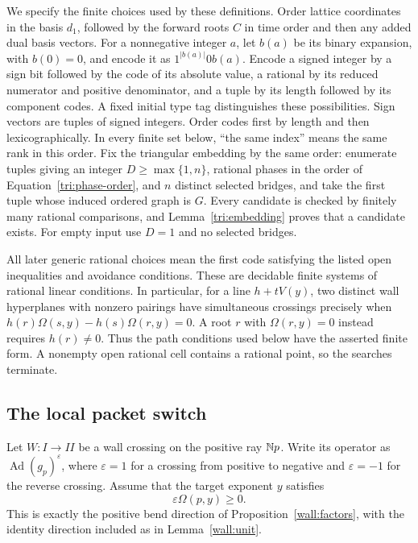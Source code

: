We specify the finite choices used by these definitions. Order lattice
coordinates in the basis $d_1$, followed by the forward roots $C$ in
time order and then any added dual basis vectors.
For a nonnegative integer $a$,
let $b(a)$ be its binary expansion, with $b(0)=0$, and encode it as
$1^{|b(a)|}0b(a)$.  Encode a signed integer by a sign bit followed by
the code of its absolute value, a rational by its reduced numerator
and positive denominator, and a tuple by its length followed by its
component codes.  A fixed initial type tag distinguishes these
possibilities.  Sign vectors are tuples of signed integers.  Order
codes first by length and then lexicographically.  In every finite
set below, ``the same index'' means the same rank in this order.
Fix the triangular embedding by the same order: enumerate tuples giving
an integer $D\geq\max\{1,n\}$, rational phases in the order of
Equation~\eqref{tri:phase-order}, and $n$ distinct selected bridges,
and take the first tuple whose induced ordered graph is $G$.
Every candidate is checked by finitely many rational comparisons, and
Lemma~\ref{tri:embedding} proves that a candidate exists.  For empty
input use $D=1$ and no selected bridges.

All later generic rational choices mean the first code satisfying the
listed open inequalities and avoidance conditions.  These are decidable
finite systems of rational linear conditions.  In particular, for a
line $h+tV(y)$, two distinct wall hyperplanes with nonzero pairings
have simultaneous crossings precisely when
$h(r)\Omega(s,y)-h(s)\Omega(r,y)=0$.  A root $r$ with
$\Omega(r,y)=0$ instead requires $h(r)\ne0$.  Thus the path conditions
used below have the asserted finite form.  A nonempty open rational cell contains a rational
point, so the searches terminate.

\subsection{The local packet switch}
\label{route:local}

Let $W:I\longrightarrow II$ be a wall crossing on the positive ray
$\mathbb N p$.  Write its operator as $\operatorname{Ad}(g_p)^\varepsilon$,
where $\varepsilon=1$ for a crossing from positive to negative and
$\varepsilon=-1$ for the reverse crossing.  Assume that the target
exponent $y$ satisfies
\begin{equation}
 \label{route:positive-total}
 \varepsilon\Omega(p,y)\geq0.
\end{equation}
This is exactly the positive bend direction of
Proposition~\ref{wall:factors}, with the identity direction included
as in Lemma~\ref{wall:unit}.

